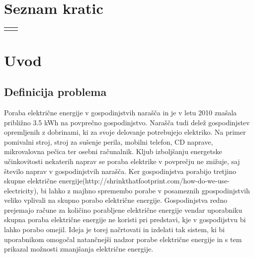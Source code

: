 \documentclass[12pt,a4paper,titlepage,openany]{report}
\begin{document}
\tableofcontents
{}
\newpage
\listoftables
{}
\newpage
\listoffigures
{}
\newpage
\renewcommand{\cftdot}{}
\listofappendices
\thispagestyle{fancy}
\newpage

\chapter*{Seznam kratic}
\thispagestyle{fancyplain}
\begin{longtable}{@{}p{1cm}@{}p{\dimexpr\textwidth-1cm\relax}@{}}
\nomenclature{$tj.$}{to je}
\nomenclature{$npr.$}{na primer}
\end{longtable}
\newpage

\normalsize


% 
% 

\chapter{Uvod}
\thispagestyle{fancy}

\section{Definicija problema}
\thispagestyle{fancy}


Poraba električne energije v gospodinjstvih narašča in je v letu 2010 znašala približno 3.5 kWh na povprečno gospodinjstvo. Narašča tudi delež gospodinjstev opremljenih z dobrinami, ki za svoje delovanje potrebujejo elektriko. Na primer pomivalni stroj, stroj za sušenje perila, mobilni telefon, CD naprave, mikrovalovna pečica ter osebni računalnik. Kljub izboljšanju energetske učinkovitosti nekaterih naprav se poraba elektrike v povprečju ne znižuje, saj število naprav v gospodinjstvih narašča. Ker gospodinjstva porabijo tretjino skupne električne energije(http://shrinkthatfootprint.com/how-do-we-use-electricity), bi lahko z majhno spremembo porabe v posameznih gpospodinjstvih veliko vplivali na skupno porabo električne energije. Gospodinjstva redno prejemajo račune za količino porabljene električne energije vendar uporabniku skupna poraba električne energije ne koristi pri predstavi, kje v gospodijstvu bi lahko porabo omejil. Ideja je torej načrtovati in izdelati tak sistem, ki bi uporabnikom omogočal natančnejši nadzor porabe električne energije in s tem prikazal možnosti zmanjšanja električne energije.
\end{document}
